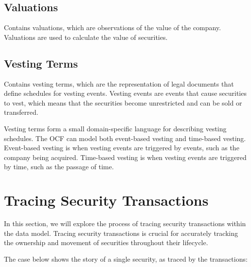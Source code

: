 \subsection{Valuations}

Contains valuations, which are observations of the value of the company. Valuations are used to calculate the value of securities.

\subsection{Vesting Terms}

Contains vesting terms, which are the representation of legal documents that define schedules for vesting events. Vesting events are events that cause securities to vest, which means that the securities become unrestricted and can be sold or transferred.

Vesting terms form a small domain-specific language for describing vesting schedules. The OCF can model both event-based vesting and time-based vesting. Event-based vesting is when vesting events are triggered by events, such as the company being acquired. Time-based vesting is when vesting events are triggered by time, such as the passage of time.

\section{Tracing Security Transactions}

In this section, we will explore the process of tracing security transactions within the data model. Tracing security transactions is crucial for accurately tracking the ownership and movement of securities throughout their lifecycle.

The case below shows the story of a single security, as traced by the transactions:

